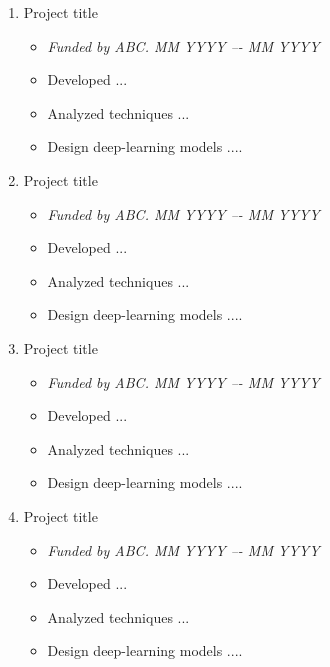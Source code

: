\begin{enumerate}[leftmargin=*,nosep]
    \item Project title 
    \begin{itemize}[leftmargin=*,nosep]
        \item\textit{Funded by ABC. 	 \hfill MM YYYY –- MM YYYY}
        \item	Developed ...
        \item	Analyzed techniques ...
        \item   Design deep-learning models ....
    \end{itemize}
    
     \item Project title 
    \begin{itemize}[leftmargin=*,nosep]
        \item\textit{Funded by ABC. 	 \hfill MM YYYY –- MM YYYY}
        \item	Developed ...
        \item	Analyzed techniques ...
        \item   Design deep-learning models ....
    \end{itemize}
    
    \item Project title 
    \begin{itemize}[leftmargin=*,nosep]
        \item\textit{Funded by ABC. 	 \hfill MM YYYY –- MM YYYY}
        \item	Developed ...
        \item	Analyzed techniques ...
        \item   Design deep-learning models ....
    \end{itemize}
    
    \item Project title 
    \begin{itemize}[leftmargin=*,nosep]
        \item\textit{Funded by ABC. 	 \hfill MM YYYY –- MM YYYY}
        \item	Developed ...
        \item	Analyzed techniques ...
        \item   Design deep-learning models ....
    \end{itemize}
    
\end{enumerate}

